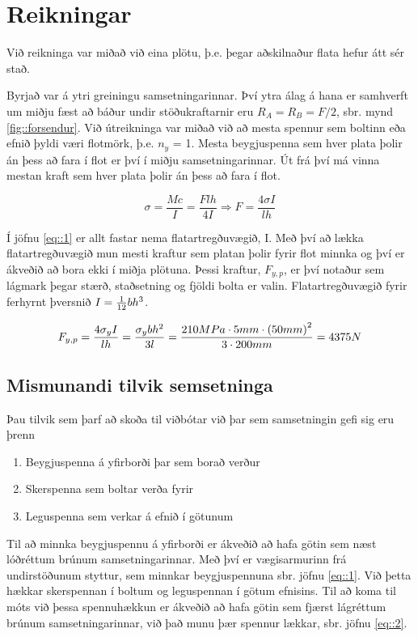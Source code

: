 \section{Reikningar}\label{ch::reikningar}

Við reikninga var miðað við eina plötu, þ.e. þegar aðskilnaður flata hefur átt sér stað. 

Byrjað var á ytri greiningu samsetningarinnar. Því ytra álag á hana er samhverft um miðju fæst að báður undir stöðukraftarnir eru $R_{A} = R_{B} = F/2$, sbr. mynd \ref{fig::forsendur}. Við útreikninga var miðað við að mesta spennur sem boltinn eða efnið þyldi væri flotmörk, þ.e. $n_y$ = 1. Mesta beygjuspenna sem hver plata þolir án þess að fara í flot er því í miðju samsetningarinnar. Út frá því má vinna mestan kraft sem hver plata þolir án þess að fara í flot.

\begin{equation}
	\sigma = \frac{M c}{I} = \frac{F l h}{4I} \Rightarrow F = \frac{4 \sigma I}{l h}
	\label{eq::1}
\end{equation}

Í jöfnu \ref{eq::1} er allt fastar nema flatartregðuvægið, I. Með því að lækka flatartregðuvægið mun mesti kraftur sem platan þolir fyrir flot minnka og því er ákveðið að bora ekki í miðja plötuna. Þessi kraftur, $F_{y,p}$, er því notaður sem lágmark þegar stærð, staðsetning og fjöldi bolta er valin. Flatartregðuvægið fyrir ferhyrnt þversnið $I = {1 \over 12}bh^3$.

\[
	F_{y,p} = \frac{4  \sigma_y I}{l h} = {\sigma_y b h^2 \over 3 l} = {210 MPa \cdot 5 mm \cdot \left(50mm\right)^2 \over 3 \cdot 200mm} = 4375N
\]

\subsection{Mismunandi tilvik semsetninga}

Þau tilvik sem þarf að skoða til viðbótar við þar sem samsetningin gefi sig eru þrenn

\begin{enumerate}
	\item Beygjuspenna á yfirborði þar sem borað verður
	\item Skerspenna sem boltar verða fyrir
	\item Leguspenna sem verkar á efnið í götunum
\end{enumerate}

Til að minnka beygjuspennu á yfirborði er ákveðið að hafa götin sem næst lóðréttum brúnum samsetningarinnar. Með því er vægisarmurinn frá undirstöðunum styttur, sem minnkar beygjuspennuna sbr. jöfnu \ref{eq::1}. Við þetta hækkar skerspennan í boltum og leguspennan í götum efnisins. Til að koma til móts við þessa spennuhækkun er ákveðið að hafa götin sem fjærst lágréttum brúnum samsetningarinnar, við það munu þær spennur lækkar, sbr. jöfnu \ref{eq::2}\cite{shigleys}.

